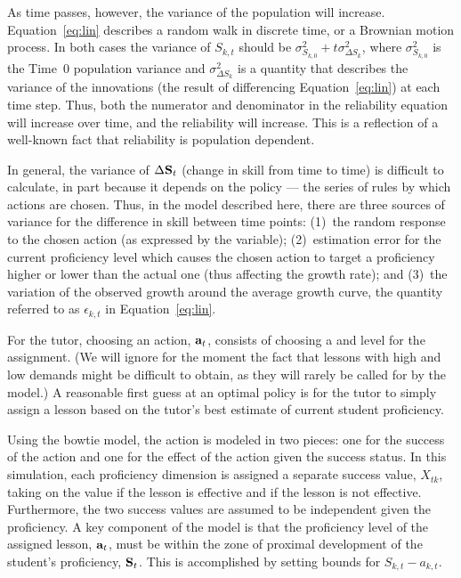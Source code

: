 \documentclass[12pt]{RR-article}
\begin{document}
As time passes, however,  the variance of the population will
increase.  Equation~\ref{eq:lin} describes a random walk in discrete
time, or a Brownian motion process.  In both cases the variance of
${S_{k,t}}$ should be $\sigma^2_{S_{k,0}} + t \sigma^2_{\Delta S_k}$,
where $\sigma^2_{S_{k,0}}$ is the Time~0 population variance and
$\sigma^2_{\Delta S_k}$ is a quantity that describes the variance of
the innovations (the result of differencing Equation~\ref{eq:lin}) at
each time step.  Thus, both the numerator and denominator in the
reliability equation will increase over time, and the reliability will
increase.  This is a reflection of a well-known fact that reliability
is population dependent.

In general, the variance of $\Delta {\bf S}_t$ (change in skill from
time to time) is difficult to calculate, in part because it depends on
the policy --- the series of rules by which actions are chosen.  Thus,
in the model described here, there are three sources of variance for
the difference in skill between time points:  (1)~the random response
to the chosen action (as expressed by the  variable);
(2)~estimation error for the current proficiency level which causes
the chosen action to target a proficiency higher or lower than the
actual one (thus affecting the growth rate); and (3)~the variation of
the observed growth around the average growth curve, the quantity
referred to as $\epsilon_{k,t}$ in Equation~\ref{eq:lin}.

\smallskip

For the tutor, choosing an action, ${\bf a}_t$, consists of choosing
a  and  level for the assignment.
(We will ignore for the moment the fact that lessons with high
 and low  demands might be
difficult to obtain, as they will rarely be called for by the model.)
A reasonable first guess at an optimal policy is for the tutor to
simply assign a lesson based on the tutor's best estimate of
current student proficiency.  

Using the bowtie model, the action is modeled in two pieces: one for
the success of the action and one for the effect of the action given
the success status.  In this simulation, each proficiency dimension
is assigned a separate success value, $X_{tk}$, taking on the value
 if the lesson is effective and  if the lesson
is not effective.  Furthermore, the two success values are assumed to
be independent given the proficiency.  A key component of the model is
that the proficiency level of the assigned lesson, ${\bf a}_t$, must
be within the zone of proximal development of the student's
proficiency, ${\bf S}_t$.  This is accomplished by setting
bounds for $S_{k,t} - a_{k,t}$.
\end{document}
